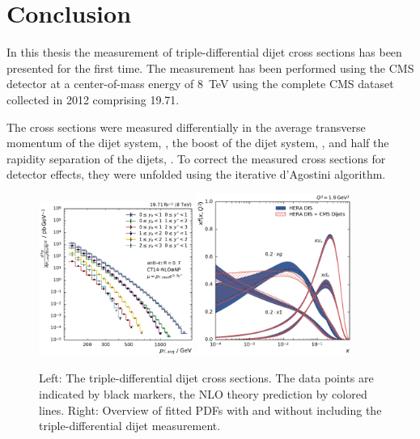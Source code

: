 
\chapter{Conclusion}

In this thesis the measurement of triple-differential dijet cross sections has
been presented for the first time. The measurement has been performed using the
CMS detector at a center-of-mass energy of \SI{8}{\TeV} using the complete CMS
dataset collected in 2012 comprising \SI{19.71}{\fbinv}.

The cross sections were measured differentially in the average transverse
momentum of the dijet system, \ptavg, the boost of the dijet system, \yboost,
and half the rapidity separation of the dijets, \ystar. To correct the measured
cross sections for detector effects, they were unfolded using the iterative
d'Agostini algorithm. 

\begin{figure}[h!tbp]
    \centering
    \includegraphics[width=0.45\textwidth]{figures/measurement/ptavg_spectrum.pdf}\hfill
    \includegraphics[width=0.45\textwidth]{figures/pdf_constraints/pdfcomp_direct_overview_1.9.pdf}
    \caption[Triple-differential dijet cross sections and PDF
    overview]{Left:
    The triple-differential dijet cross sections. The data points are indicated by black
    markers, the NLO theory prediction by colored lines. Right: Overview of
    fitted PDFs with and without including the triple-differential dijet
    measurement.}
    \label{fig:conclusion}
\end{figure}

